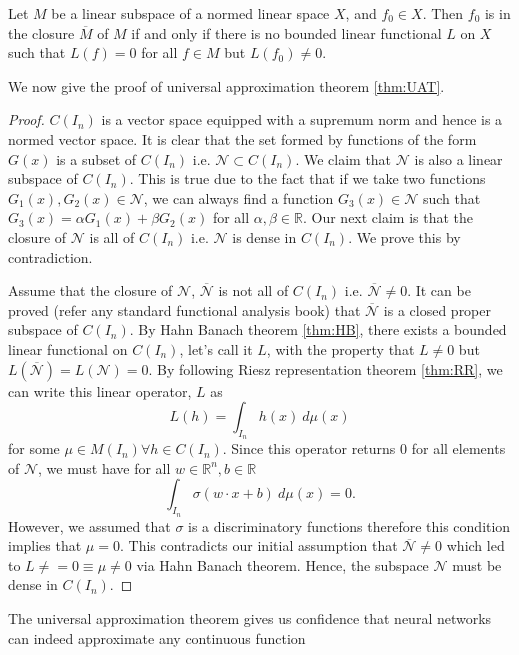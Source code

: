 \begin{thm}
    \label{thm:HB}
    Let $M$ be a linear subspace of a normed linear space $X$, and $f_0 \in X$. Then $f_0$ is 
    in the closure $\overline{M}$ of $M$ if and only if there is no bounded linear functional 
    $L$ on $X$ such that $L(f) = 0 $ for all $f\in M$ but $L(f_0) \neq 0$.
\end{thm}
We now give the proof of universal approximation theorem \ref{thm:UAT}.
\begin{proof}
   $C(I_n)$ is a vector space equipped with a supremum norm and hence is a normed vector space. It is
   clear that the set formed by functions of the form $G(x)$ is a subset of $C(I_n)$ i.e. $\mathcal{N} \subset C(I_n)$.
   We claim that $\mathcal{N}$ is also a linear subspace of $C(I_n)$. This is true due to the fact that if 
   we take two functions $G_1(x), G_2(x) \in \mathcal{N}$, we can always find a function $G_3(x) \in \mathcal{N}$ such that 
   $G_3(x) = \alpha G_1(x) + \beta G_2(x)$ for all $\alpha, \beta \in \mathbb{R}$. Our next claim is that the closure of 
   $\mathcal{N}$ is all of $C(I_n)$ i.e. $\mathcal{N}$ is dense in $C(I_n)$. We prove this by contradiction. 

   Assume that the closure of $\mathcal{N}$, $\overline{\mathcal{N}}$ is not all of $C(I_n)$ i.e. 
   $\overline{\mathcal{N}} \neq 0$. It can be proved (refer any standard functional analysis book) that $\overline{\mathcal{N}}$
   is a closed proper subspace of $C(I_n)$.  By Hahn Banach theorem \ref{thm:HB}, there exists a bounded 
   linear functional on $C(I_n)$, let's call it $L$, with the property that $L \neq 0$ but $L(\overline{\mathcal{N}}) = L(\mathcal{N}) = 0$.
   By following Riesz representation theorem \ref{thm:RR}, we can write this linear operator, $L$ as 
   $$L(h) = \int_{I_n} h(x) \ d\mu(x)$$
   for some $\mu \in M(I_n) \forall h \in C(I_n)$. Since this operator returns $0$ for all elements of $\mathcal{N}$,
   we must have for all $w \in \mathbb{R}^n, b \in \mathbb{R}$ 
   $$\int_{I_n} \sigma (w \cdot x + b) \ d\mu(x) = 0.$$
   However, we assumed that $\sigma$ is a discriminatory functions therefore this condition implies that $\mu =0$. This contradicts our initial assumption that 
   $\overline{\mathcal{N}} \neq 0$ which led to $L \neq = 0 \equiv \mu \neq 0$ via Hahn Banach theorem. Hence, the subspace $\mathcal{N}$ must be dense in $C(I_n)$. 
\end{proof}
The universal approximation theorem gives us confidence that neural networks can indeed approximate any continuous function 
